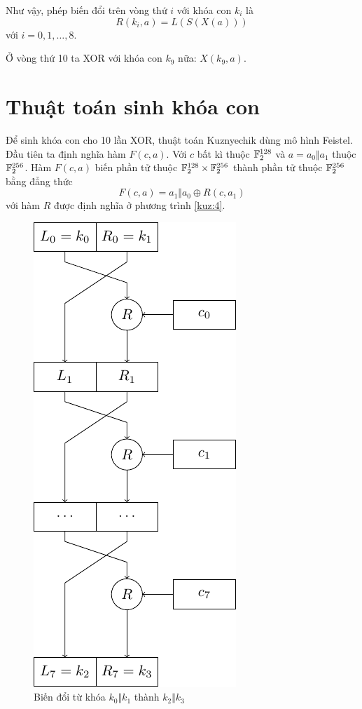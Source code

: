 Như vậy, phép biến đổi trên vòng thứ $i$ với khóa con $k_i$ là
\begin{equation}\label{kuz:4}
    R(k_i, a) = L(S(X(a)))
\end{equation}
với $i = 0, 1, \ldots, 8$.

Ở vòng thứ 10 ta XOR với khóa con $k_9$ nữa: $X(k_9, a)$.

\section{Thuật toán sinh khóa con}

Để sinh khóa con cho 10 lần XOR, thuật toán Kuznyechik dùng mô hình Feistel.
Đầu tiên ta định nghĩa hàm $F(c, a)$. Với $c$ bất kì thuộc $\mathbb{F}_2^{128}$
và $a = a_0 \Vert a_1$ thuộc $\mathbb{F}_2^{256}$. Hàm $F(c, a)$ biến phần
tử thuộc $\mathbb{F}_2^{128} \times \mathbb{F}_2^{256}$ thành phần tử thuộc 
$\mathbb{F}_2^{256}$ bằng đẳng thức
\[F(c, a) = a_1 \Vert a_0 \oplus R(c, a_1)\] 
với hàm $R$ được định nghĩa ở phương trình \ref{kuz:4}.

\begin{figure}[ht]
    \centering
    \includegraphics{Kuznyechik/funcF.pdf}
    \caption{Biến đổi từ khóa $k_0 \Vert k_1$ thành $k_2 \Vert k_3$}
    \label{kuzfic:2}
\end{figure}

